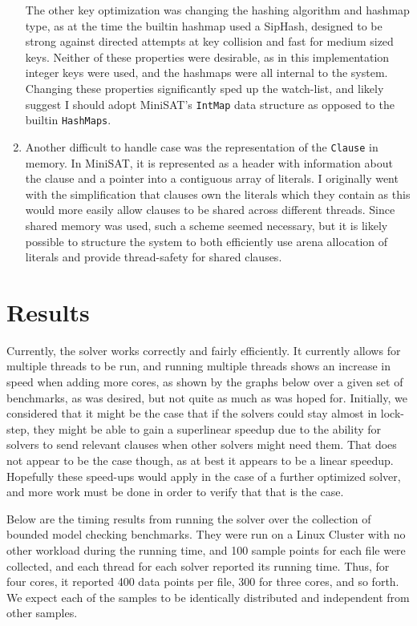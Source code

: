 \documentclass[11pt]{extarticle}
\begin{document}
\begin{enumerate}
The other key optimization was changing the hashing algorithm and hashmap type, as at the time
the builtin hashmap used a SipHash, designed to be strong against directed attempts at key
collision and fast for medium sized keys. Neither of these properties were desirable, as in this
implementation integer keys were used, and the hashmaps were all internal to the system.
Changing these properties significantly sped up the watch-list, and likely suggest I should
adopt MiniSAT's \texttt{IntMap} data structure as opposed to the builtin \texttt{HashMaps}.
\item
Another difficult to handle case was the representation of the \texttt{Clause} in memory. In
MiniSAT, it is represented as a header with information about the clause and a pointer into a
contiguous array of literals. I originally went with the simplification that clauses own the
literals which they contain as this would more easily allow clauses to be shared across
different threads. Since shared memory was used, such a scheme seemed necessary, but it is
likely possible to structure the system to both efficiently use arena allocation of literals
and provide thread-safety for shared clauses.
\end{enumerate}
\section*{Results}
Currently, the solver works correctly and fairly efficiently. It currently allows for multiple
threads to be run, and running multiple threads shows an increase in speed when adding more
cores, as shown by the graphs below over a given set of benchmarks, as was desired, but not
quite as much as was hoped for. Initially, we considered that it might be the case that if the
solvers could stay almost in lock-step, they might be able to gain a superlinear speedup due to
the ability for solvers to send relevant clauses when other solvers might need them. That does
not appear to be the case though, as at best it appears to be a linear speedup. Hopefully these
speed-ups would apply in the case of a further optimized solver, and more work must be done in
order to verify that that is the case.

Below are the timing results from running the solver over the collection of bounded model
checking benchmarks. They were run on a Linux Cluster with no other workload during the running
time, and 100 sample points for each file were collected, and each thread for each solver
reported its running time. Thus, for four cores, it reported 400 data points per file, 300 for
three cores, and so forth. We expect each of the samples to be identically distributed and
independent from other samples.
\end{document}
